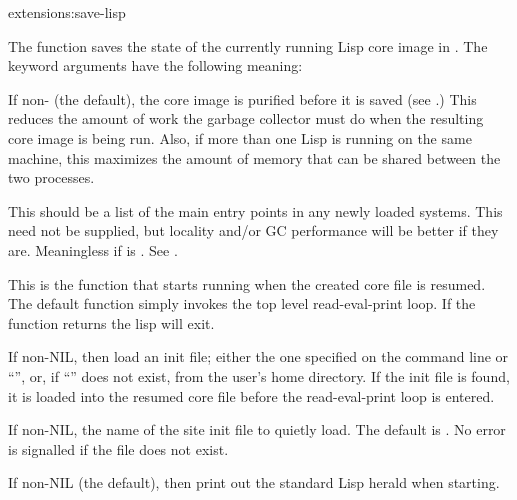 \begin{defun}{extensions:}{save-lisp}{%
    }
  
  The  function saves the state of the currently
  running Lisp core image in .  The keyword arguments have
  the following meaning:
  \begin{Lentry}
    
  \item[\kwd{purify}] If non-\nil{} (the default), the core image is
    purified before it is saved (see .)  This reduces
    the amount of work the garbage collector must do when the
    resulting core image is being run.  Also, if more than one Lisp is
    running on the same machine, this maximizes the amount of memory
    that can be shared between the two processes.
    
  \item[\kwd{root-structures}]
      This should be a list of the main entry points in any newly
      loaded systems.  This need not be supplied, but locality and/or
      GC performance will be better if they are.  Meaningless if
       is \nil.  See .

  \item[\kwd{init-function}] This is the function that starts running
    when the created core file is resumed.  The default function
    simply invokes the top level read-eval-print loop.  If the
    function returns the lisp will exit.
    
  \item[\kwd{load-init-file}] If non-NIL, then load an init file;
    either the one specified on the command line or
    ``'', or, if
    ``'' does not exist,
     from the user's home directory.  If the init file
    is found, it is loaded into the resumed core file before the
    read-eval-print loop is entered.
    
  \item[\kwd{site-init}] If non-NIL, the name of the site init file to
    quietly load.  The default is .  No error
    is signalled if the file does not exist.
    
  \item[\kwd{print-herald}] If non-NIL (the default), then print out
    the standard Lisp herald when starting.
    

\end{Lentry}
\end{defun}

